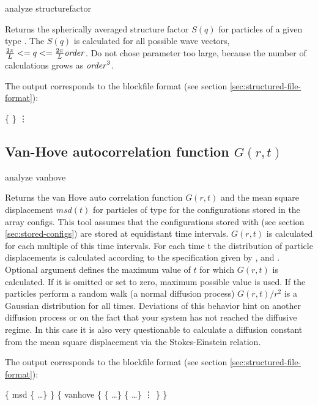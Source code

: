 \begin{essyntax}
  analyze structurefactor  
\end{essyntax}

Returns the spherically averaged structure factor $S(q)$ for particles
of a given type . The $S(q)$ is calculated for all possible
wave vectors, $\frac{2\pi}{L} <= q <= \frac{2\pi}{L}\mathrm{\mathit{order}}$. Do
not chose parameter  too large, because the number of
calculations grows as $\mathrm{\mathit{order}}^3$. 



The output corresponds to the blockfile format (see section
\vref{sec:structured-file-format}):
\begin{code}
\{   \} 
\vdots
\end{code}

\subsection{Van-Hove autocorrelation function $G(r,t)$}
\label{analyze:vanhove}
\begin{essyntax}
  analyze vanhove    
\end{essyntax}
Returns the van Hove auto correlation function $G(r,t)$ and the mean
square displacement $msd(t)$ for particles of type  for the
configurations stored in the array configs. This tool assumes that the
configurations stored with  (see section
\vref{sec:stored-configs}) are stored at equidistant time intervals.
$G(r,t)$ is calculated for each multiple of this time intervals. For
each time t the distribution of particle displacements is calculated
according to the specification given by ,  and
. Optional argument  defines the maximum value
of $t$ for which $G(r,t)$ is calculated. If it is omitted or set to
zero, maximum possible value is used.
If the particles perform a random walk (\ie a normal
diffusion process) $G(r,t)/r^2$ is a Gaussian distribution for all
times.  Deviations of this behavior hint on another diffusion process
or on the fact that your system has not reached the diffusive regime.
In this case it is also very questionable to calculate a diffusion
constant from the mean square displacement via the Stokes-Einstein
relation. 

The output corresponds to the blockfile format (see section
\vref{sec:structured-file-format}):
\begin{code}
\{ msd \{   \dots \} \} 
\{ vanhove \{ \{   \dots \} 
            \{   \dots \}
\vdots
          \}
\}
\end{code}

